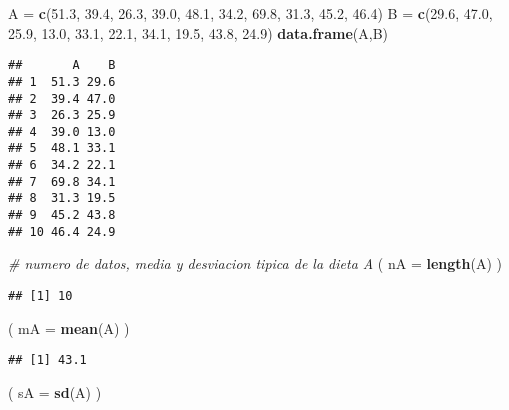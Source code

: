 \documentclass[]{article}
\newenvironment{Shaded}{\begin{snugshade}}{\end{snugshade}}
\newcommand{\KeywordTok}[1]{\textcolor[rgb]{0.13,0.29,0.53}{\textbf{#1}}}
\newcommand{\DataTypeTok}[1]{\textcolor[rgb]{0.13,0.29,0.53}{#1}}
\newcommand{\FloatTok}[1]{\textcolor[rgb]{0.00,0.00,0.81}{#1}}
\newcommand{\StringTok}[1]{\textcolor[rgb]{0.31,0.60,0.02}{#1}}
\newcommand{\CommentTok}[1]{\textcolor[rgb]{0.56,0.35,0.01}{\textit{#1}}}
\newcommand{\NormalTok}[1]{#1}
\begin{document}
\begin{Shaded}
\begin{Highlighting}[]
\NormalTok{A =}\StringTok{ }\KeywordTok{c}\NormalTok{(}\FloatTok{51.3}\NormalTok{, }\FloatTok{39.4}\NormalTok{, }\FloatTok{26.3}\NormalTok{, }\FloatTok{39.0}\NormalTok{, }\FloatTok{48.1}\NormalTok{, }\FloatTok{34.2}\NormalTok{, }\FloatTok{69.8}\NormalTok{, }\FloatTok{31.3}\NormalTok{, }\FloatTok{45.2}\NormalTok{, }\FloatTok{46.4}\NormalTok{)}
\NormalTok{B =}\StringTok{ }\KeywordTok{c}\NormalTok{(}\FloatTok{29.6}\NormalTok{, }\FloatTok{47.0}\NormalTok{, }\FloatTok{25.9}\NormalTok{, }\FloatTok{13.0}\NormalTok{, }\FloatTok{33.1}\NormalTok{, }\FloatTok{22.1}\NormalTok{, }\FloatTok{34.1}\NormalTok{, }\FloatTok{19.5}\NormalTok{, }\FloatTok{43.8}\NormalTok{, }\FloatTok{24.9}\NormalTok{)}
\KeywordTok{data.frame}\NormalTok{(A,B)}
\end{Highlighting}
\end{Shaded}

\begin{verbatim}
##       A    B
## 1  51.3 29.6
## 2  39.4 47.0
## 3  26.3 25.9
## 4  39.0 13.0
## 5  48.1 33.1
## 6  34.2 22.1
## 7  69.8 34.1
## 8  31.3 19.5
## 9  45.2 43.8
## 10 46.4 24.9
\end{verbatim}

\begin{Shaded}
\begin{Highlighting}[]
\CommentTok{# numero de datos, media y desviacion tipica de la dieta A}
\NormalTok{( }\DataTypeTok{nA =} \KeywordTok{length}\NormalTok{(A) )}
\end{Highlighting}
\end{Shaded}

\begin{verbatim}
## [1] 10
\end{verbatim}

\begin{Shaded}
\begin{Highlighting}[]
\NormalTok{( }\DataTypeTok{mA =} \KeywordTok{mean}\NormalTok{(A) )}
\end{Highlighting}
\end{Shaded}

\begin{verbatim}
## [1] 43.1
\end{verbatim}

\begin{Shaded}
\begin{Highlighting}[]
\NormalTok{( }\DataTypeTok{sA =} \KeywordTok{sd}\NormalTok{(A) )}
\end{Highlighting}
\end{Shaded}
\end{document}

